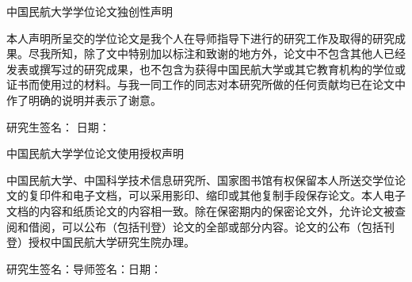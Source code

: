 \begin{titlepage}
            \begin{center}
                \heiti
                中国民航大学学位论文独创性声明
            \end{center}
            \vspace{1.8em}
            \songti {}
            \setlength{\baselineskip}{26pt}
    
            本人声明所呈交的学位论文是我个人在导师指导下进行的研究工作及取得的研究成果。尽我所知，除了文中特别加以标注和致谢的地方外，论文中不包含其他人已经发表或撰写过的研究成果，也不包含为获得中国民航大学或其它教育机构的学位或证书而使用过的材料。与我一同工作的同志对本研究所做的任何贡献均已在论文中作了明确的说明并表示了谢意。
    
            \vspace{1.8em}
    
            \qquad\quad\qquad\qquad\qquad\qquad 研究生签名：\underline{\qquad\qquad\qquad} 日\quad 期：\underline{\qquad\qquad\qquad}
    
            \vspace{3.8em}
    
    
            \begin{center}
                \heiti
                \setlength{\baselineskip}{26pt}
                中国民航大学学位论文使用授权声明
            \end{center}
    
            \vspace{1.8em}
            {
            \songti
            \setlength{\baselineskip}{28pt}
            中国民航大学、中国科学技术信息研究所、国家图书馆有权保留本人所送交学位论文的复印件和电子文档，可以采用影印、缩印或其他复制手段保存论文。本人电子文档的内容和纸质论文的内容相一致。除在保密期内的保密论文外，允许论文被查阅和借阅，可以公布（包括刊登）论文的全部或部分内容。论文的公布（包括刊登）授权中国民航大学研究生院办理。
    
            \vspace{1.8em}
    
            \noindent 研究生签名：\underline{\qquad\qquad\qquad}导师签名：\underline{\qquad\qquad\qquad}日\quad 期：\underline{\qquad\qquad\qquad}
            
             }
\end{titlepage}
\newpage
\restoregeometry




